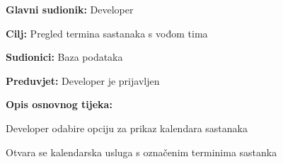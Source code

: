                         	\noindent {}
                        	\begin{packed_item}
                        		
                        		\item \textbf{Glavni sudionik: }Developer
                        		\item  \textbf{Cilj:} Pregled termina sastanaka s vođom tima
                        		\item  \textbf{Sudionici:} Baza podataka
                        		\item  \textbf{Preduvjet:} Developer je prijavljen
                        		\item  \textbf{Opis osnovnog tijeka:}
                        		
                        		\item[] \begin{packed_enum}
                        			
                        			\item Developer odabire opciju za prikaz kalendara sastanaka
                        			\item Otvara se kalendarska usluga s označenim terminima sastanka
                        			
                        		\end{packed_enum}
                        		
                        	\end{packed_item}
                        	\noindent {}
